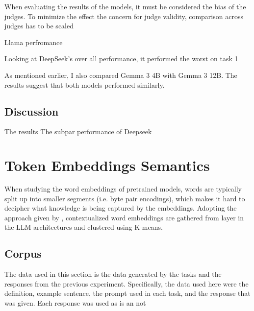 \documentclass{brandeis-thesis3.2}
\theoremstyle{plain}
\theoremstyle{definition}
\theoremstyle{remark}
\numberwithin{equation}{section}
\begin{document}
When evaluating the results of the models, it must be considered the bias of the judges. To minimize the effect the concern for judge validity, comparison across judges has to be scaled 

Llama perfromance

Looking at DeepSeek's over all performance, it performed the worst on task 1

As mentioned earlier, I also compared Gemma 3 4B with Gemma 3 12B. The results suggest that both models performed similarly.

\section{Discussion}

The results The subpar performance of Deepseek 


\chapter{Token Embeddings Semantics}
When studying the word embeddings of pretrained models, words are typically split up into smaller segments (i.e. byte pair encodings), which makes it hard to decipher what knowledge is being captured by the embeddings. Adopting the approach given by \citealt{chronis_when_2020}, contextualized word embeddings are gathered from layer in the LLM architectures and clustered using K-means. 

\section{Corpus}
The data used in this section is the data generated by the tasks and the responses from the previous experiment. Specifically, the data used here were the definition, example sentence, the prompt used in each task, and the response that was given. Each response was used as is an not
\end{document}
